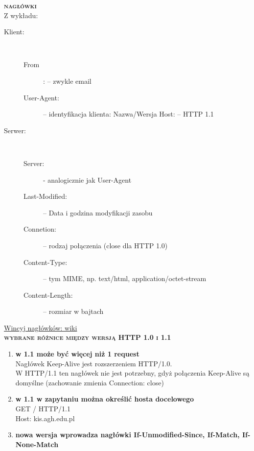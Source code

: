 \textsc{\textbf{nagłówki}}\\
Z wykładu:
\begin{description}

\item[Klient:] \hfill \\
	\begin{description}
	\item[From]: – zwykle email
	\item[User-Agent:] – identyfikacja klienta: Nazwa/Wersja Host: – HTTP 1.1
	\end{description}
\item[Serwer:] \hfill \\
	\begin{description}
		\item[Server:] - analogicznie jak User-Agent
		\item[Last-Modified:] – Data i godzina modyfikacji zasobu 
		\item[Connetion:] – rodzaj połączenia (close dla HTTP 1.0)
		\item[Content-Type:] – tym MIME, np. text/html, application/octet-stream
		\item[Content-Length:] – rozmiar w bajtach
	\end{description}
\end{description}
\href{http://www.wikiwand.com/pl/Lista_nag%C5%82%C3%B3wk%C3%B3w_HTTP}{Wincyj nagłówków: wiki} 
\\


\textsc{\textbf{wybrane różnice między wersją HTTP 1.0 i 1.1}}
\begin{enumerate}
\item{\textbf{ w 1.1 może być więcej niż 1 request}\\
Nagłówek Keep-Alive jest rozszerzeniem HTTP/1.0. \\
W HTTP/1.1 ten nagłówek nie jest potrzebny, gdyż połączenia Keep-Alive są domyślne (zachowanie zmienia Connection: close)}
\item{\textbf{w  1.1 w zapytaniu można określić hosta docelowego}\\
GET / HTTP/1.1 \\
Host: kis.agh.edu.pl}
\item{\textbf{nowa wersja wprowadza nagłówki If-Unmodified-Since, If-Match, If-None-Match}}

\end{enumerate}






